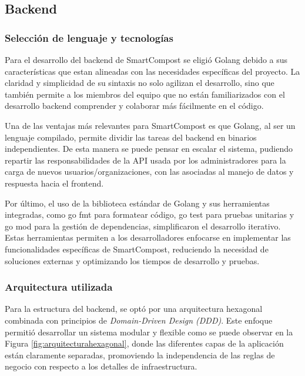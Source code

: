 \subsection{Backend}
\subsubsection{Selección de lenguaje y tecnologías}

Para el desarrollo del backend de SmartCompost se eligió Golang debido a sus características que estan alineadas con las necesidades específicas del proyecto. La claridad y simplicidad de su sintaxis no solo agilizan el desarrollo, sino que también permite a los miembros del equipo que no están familiarizados con el desarrollo backend comprender y colaborar más fácilmente en el código. 

Una de las ventajas más relevantes para SmartCompost es que Golang, al ser un lenguaje compilado, permite dividir las tareas del backend en binarios independientes. De esta manera se puede pensar en escalar el sistema, pudiendo repartir las responsabilidades de la API usada por los administradores para la carga de nuevos usuarios/organizaciones, con las asociadas al manejo de datos y respuesta hacia el frontend. 

Por último, el uso de la biblioteca estándar de Golang \cite{GoStdlibTesting} y sus herramientas integradas, como go fmt para formatear código, go test para pruebas unitarias y go mod para la gestión de dependencias, simplificaron el desarrollo iterativo. Estas herramientas permiten a los desarrolladores enfocarse en implementar las funcionalidades específicas de SmartCompost, reduciendo la necesidad de soluciones externas y optimizando los tiempos de desarrollo y pruebas.


\subsubsection{Arquitectura utilizada}
Para la estructura del backend, se optó por una arquitectura hexagonal \citep{ArquitecturaHexagonal:15} combinada con principios de \textit{Domain-Driven Design (DDD)}\cite{Evans2003}. Este enfoque permitió desarrollar un sistema modular y flexible como se puede observar en la Figura \ref{fig:arquitecturahexagonal}\citep{ArquitecturaHexagonal:15}, donde las diferentes capas de la aplicación están claramente separadas, promoviendo la independencia de las reglas de negocio con respecto a los detalles de infraestructura.


